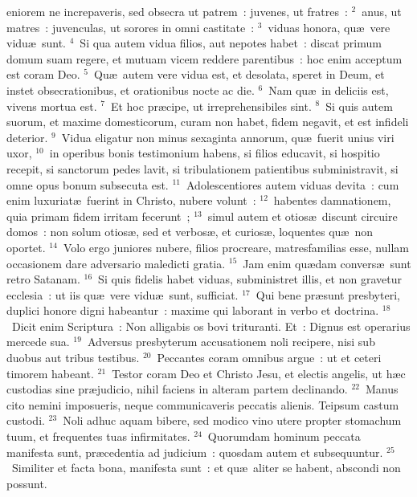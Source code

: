 \bchapter
{}eniorem ne increpaveris, sed obsecra ut patrem~: juvenes, ut fratres~:
${}^{2}$~anus, ut matres~: juvenculas, ut sorores in omni castitate~:
${}^{3}$~viduas honora, qu\ae\ vere vidu\ae\ sunt.
${}^{4}$~Si qua autem vidua filios, aut nepotes habet~: discat primum domum suam regere, et mutuam vicem reddere parentibus~: hoc enim acceptum est coram Deo.
${}^{5}$~Qu\ae\ autem vere vidua est, et desolata, speret in Deum, et instet obsecrationibus, et orationibus nocte ac die.
${}^{6}$~Nam qu\ae\ in deliciis est, vivens mortua est.
${}^{7}$~Et hoc pr\ae cipe, ut irreprehensibiles sint.
${}^{8}$~Si quis autem suorum, et maxime domesticorum, curam non habet, fidem negavit, et est infideli deterior.
${}^{9}$~Vidua eligatur non minus sexaginta annorum, qu\ae\ fuerit unius viri uxor,
${}^{10}$~in operibus bonis testimonium habens, si filios educavit, si hospitio recepit, si sanctorum pedes lavit, si tribulationem patientibus subministravit, si omne opus bonum subsecuta est.
${}^{11}$~Adolescentiores autem viduas devita~: cum enim luxuriat\ae\ fuerint in Christo, nubere volunt~:
${}^{12}$~habentes damnationem, quia primam fidem irritam fecerunt~;
${}^{13}$~simul autem et otios\ae\ discunt circuire domos~: non solum otios\ae , sed et verbos\ae , et curios\ae , loquentes qu\ae\ non oportet.
${}^{14}$~Volo ergo juniores nubere, filios procreare, matresfamilias esse, nullam occasionem dare adversario maledicti gratia.
${}^{15}$~Jam enim qu\ae dam convers\ae\ sunt retro Satanam.
${}^{16}$~Si quis fidelis habet viduas, subministret illis, et non gravetur ecclesia~: ut iis qu\ae\ vere vidu\ae\ sunt, sufficiat.
${}^{17}$~Qui bene pr\ae sunt presbyteri, duplici honore digni habeantur~: maxime qui laborant in verbo et doctrina.
${}^{18}$~Dicit enim Scriptura~: Non alligabis os bovi trituranti. Et~: Dignus est operarius mercede sua.
${}^{19}$~Adversus presbyterum accusationem noli recipere, nisi sub duobus aut tribus testibus.
${}^{20}$~Peccantes coram omnibus argue~: ut et ceteri timorem habeant.
${}^{21}$~Testor coram Deo et Christo Jesu, et electis angelis, ut h\ae c custodias sine pr\ae judicio, nihil faciens in alteram partem declinando.
${}^{22}$~Manus cito nemini imposueris, neque communicaveris peccatis alienis. Teipsum castum custodi.
${}^{23}$~Noli adhuc aquam bibere, sed modico vino utere propter stomachum tuum, et frequentes tuas infirmitates.
${}^{24}$~Quorumdam hominum peccata manifesta sunt, pr\ae cedentia ad judicium~: quosdam autem et subsequuntur.
${}^{25}$~Similiter et facta bona, manifesta sunt~: et qu\ae\ aliter se habent, abscondi non possunt.

